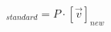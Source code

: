 \documentclass[preview]{standalone}
\begin{document}
\begin{align*}
[\vec{v}]_{standard} = P \cdot [\vec{v}]_{new}
\end{align*}
\end{document}
